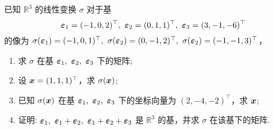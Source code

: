 \begin{example}[2003 南京航空航天大学]
    已知 $\mathbb{R}^3$ 的线性变换 $\sigma$ 对于基 $$\vb*{\varepsilon}_1=(-1,0,2)^\top,~\vb*{\varepsilon}_2=(0,1,1)^\top,~\vb*{\varepsilon}_3=(3,-1,-6)^\top$$
    的像为 $\sigma(\vb*{\varepsilon}_1)=(-1,0,1)^\top,~\sigma(\vb*{\varepsilon}_2)=(0,-1,2)^\top,~\sigma(\vb*{\varepsilon}_2)=(-1,-1,3)^\top$，
    \begin{enumerate}[label=(\arabic{*})]
        \item 求 $\sigma$ 在基 $\vb*{\varepsilon}_1,~\vb*{\varepsilon}_2,~\vb*{\varepsilon}_3$ 下的矩阵;
        \item 设 $\vb*{x}=(1,1,1)^\top$，求 $\sigma(\vb*{x})$;
        \item 已知 $\sigma(\vb*{x})$ 在基 $\vb*{\varepsilon}_1,~\vb*{\varepsilon}_2,~\vb*{\varepsilon}_3$ 下的坐标向量为 $(2,-4,-2)^\top$，求 $\vb*{x}$;
        \item 证明: $\vb*{\varepsilon}_1,~\vb*{\varepsilon}_1+\vb*{\varepsilon}_2,~\vb*{\varepsilon}_1+\vb*{\varepsilon}_2+\vb*{\varepsilon}_3$ 是 $\mathbb{R}^3$ 的基，并求 $\sigma$ 在该基下的矩阵.
    \end{enumerate}
\end{example}
